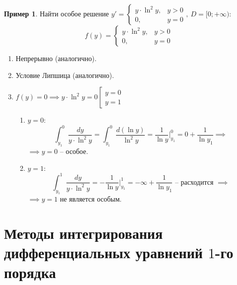 \documentclass[11pt,a4paper,oneside]{report}
\theoremstyle{definition}
\newtheorem{example}{Пример}
\theoremstyle{plain}
\theoremstyle{remark}
\begin{document}
\begin{example}
    Найти особое решение $y' = \left\{\begin{array}{rl}
            y\cdot\ln^2 y, & y > 0 \\
            0,             & y = 0
        \end{array}\right., \ D = [0;+\infty)$:
    \begin{equation*}
        f(y) = \left\{\begin{array}{rl}
            y\cdot\ln^2 y, & y > 0 \\
            0,             & y = 0
        \end{array}\right.
    \end{equation*}
    \begin{enumerate}
        \item Непрерывно (аналогично).
        \item Условие Липшица (аналогично).
        \item $f(y) = 0 \implies y\cdot\ln^2y=0 \left[\begin{array}{l}
                      y = 0 \\
                      y = 1
                  \end{array}\right.$
              \begin{enumerate}
                  \item $y = 0$:
                        \begin{equation*}
                            \int_{y_1}^{0}\frac{dy}{y \cdot \ln^2 y} = \int_{y_1}^{0}\frac{d(\ln y)}{\ln^2 y} = \frac{1}{\ln y} \Big|_{y_1}^0 = 0 + \frac{1}{\ln y_1} \implies
                        \end{equation*}
                        $\implies y =0$ -- особое.
                  \item $y = 1$:
                        \begin{equation*}
                            \int_{y_1}^{1}\frac{dy}{y\cdot \ln^2 y} = -\frac{1}{\ln y} \Big|_{y_1}^1 = -\infty + \frac{1}{\ln y_1}\text{ -- расходится } \implies
                        \end{equation*}
                        $\implies y =1$ не является особым.
              \end{enumerate}
    \end{enumerate}
\end{example}

\chapter{Методы интегрирования дифференциальных уравнений $1$-го порядка}
\end{document}
